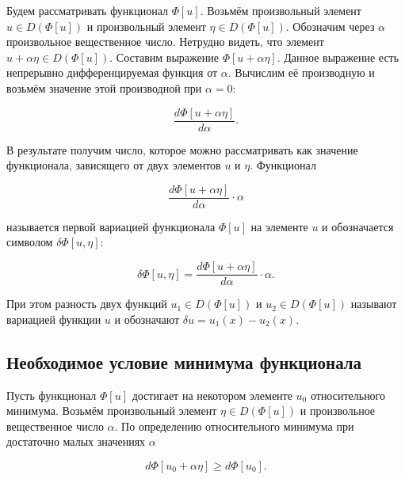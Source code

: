 \documentclass{article}
\begin{document}
Будем рассматривать функционал $\Phi[u]$. Возьмём произвольный элемент $u \in D(\Phi[u])$ и произвольный элемент $\eta \in D(\Phi[u]) $. Обозначим через $\alpha$ произвольное вещественное число. Нетрудно видеть, что элемент $ u + \alpha \eta \in D(\Phi[u])$. Составим выражение $\Phi[u + \alpha \eta]$. Данное выражение есть непрерывно дифференцируемая функция от $\alpha$. Вычислим её производную и возьмём значение этой производной при $\alpha = 0$:

\begin{displaymath}
    \frac{d\Phi[u + \alpha \eta]}{d\alpha}.
\end{displaymath}

\noindent В результате получим число, которое можно рассматривать как значение функционала, зависящего от двух элементов $u$ и $\eta$. Функционал

\begin{displaymath}
    \frac{d\Phi[u + \alpha \eta]}{d\alpha} \cdot \alpha
\end{displaymath}

\noindent называется первой вариацией функционала $\Phi[u]$ на элементе $u$ и обозначается символом $\delta \Phi[u, \eta]$:

\begin{displaymath}
     \delta \Phi[u, \eta] = \frac{d\Phi[u + \alpha \eta]}{d\alpha} \cdot \alpha.
\end{displaymath}

\noindent При этом разность двух функций $u_{1} \in D(\Phi[u])$ и $u_{2} \in D(\Phi[u])$ называют вариацией функции $u$ и обозначают $\delta u = u_{1}(x) - u_{2}(x)$.


\subsection{Необходимое условие минимума функционала}\label{sub_section_minimum_conditions}

Пусть функционал $\Phi[u]$ достигает на некотором элементе $u_{0}$ относительного минимума. Возьмём произвольный элемент $\eta \in D(\Phi[u])$ и произвольное вещественное число $\alpha$. По определению относительного минимума при достаточно малых значениях $\alpha$

\begin{displaymath}
     d\Phi[u_{0} + \alpha\eta] \geq d\Phi[u_{0}].
\end{displaymath}
\end{document}
